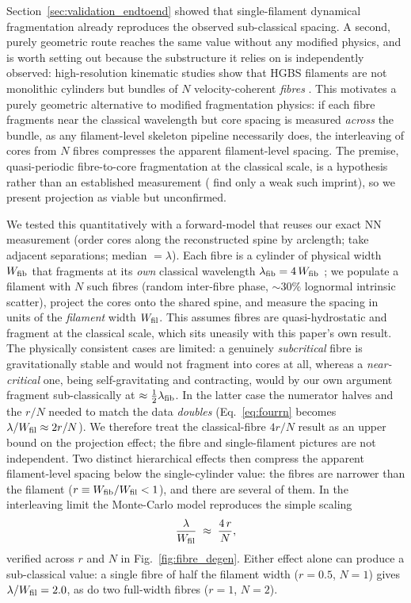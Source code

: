 \documentclass[usenatbib,twoside,twocolumn]{mnras}
\begin{document}
Section~\ref{sec:validation_endtoend} showed that single-filament dynamical fragmentation already reproduces the observed sub-classical spacing. A second, purely geometric route reaches the same value without any modified physics, and is worth setting out because the substructure it relies on is independently observed: high-resolution kinematic studies show that HGBS filaments are not monolithic cylinders but bundles of $N$ velocity-coherent \emph{fibres} \citep{Hacar2013,Hacar2018,Yang2024}. This motivates a purely geometric alternative to modified fragmentation physics: if each fibre fragments near the classical wavelength but core spacing is measured \emph{across} the bundle, as any filament-level skeleton pipeline necessarily does, the interleaving of cores from $N$ fibres compresses the apparent filament-level spacing. The premise, quasi-periodic fibre-to-core fragmentation at the classical scale, is a hypothesis rather than an established measurement (\citealt{Yang2024} find only a weak such imprint), so we present projection as viable but unconfirmed.

We tested this quantitatively with a forward-model that reuses our exact NN measurement (order cores along the reconstructed spine by arclength; take adjacent separations; median $=\lambda$). Each fibre is a cylinder of physical width $W_{\rm fib}$ that fragments at its \emph{own} classical wavelength $\lambda_{\rm fib}=4\,W_{\rm fib}$ \citep{Inutsuka1992}; we populate a filament with $N$ such fibres (random inter-fibre phase, $\sim30\%$ lognormal intrinsic scatter), project the cores onto the shared spine, and measure the spacing in units of the \emph{filament} width $W_{\rm fil}$. This assumes fibres are quasi-hydrostatic and fragment at the classical scale, which sits uneasily with this paper's own result. The physically consistent cases are limited: a genuinely \emph{subcritical} fibre is gravitationally stable and would not fragment into cores at all, whereas a \emph{near-critical} one, being self-gravitating and contracting, would by our own argument fragment sub-classically at $\approx\tfrac12\lambda_{\rm fib}$. In the latter case the numerator halves and the $r/N$ needed to match the data \emph{doubles} (Eq.~\ref{eq:fourrn} becomes $\lambda/W_{\rm fil}\approx2r/N$). We therefore treat the classical-fibre $4r/N$ result as an upper bound on the projection effect; the fibre and single-filament pictures are not independent. Two distinct hierarchical effects then compress the apparent filament-level spacing below the single-cylinder value: the fibres are narrower than the filament ($r\equiv W_{\rm fib}/W_{\rm fil}<1$), and there are several of them. In the interleaving limit the Monte-Carlo model reproduces the simple scaling
\begin{equation}
\frac{\lambda}{W_{\rm fil}} \;\approx\; \frac{4\,r}{N},
\label{eq:fourrn}
\end{equation}
verified across $r$ and $N$ in Fig.~\ref{fig:fibre_degen}. Either effect alone can produce a sub-classical value: a single fibre of half the filament width ($r=0.5$, $N=1$) gives $\lambda/W_{\rm fil}=2.0$, as do two full-width fibres ($r=1$, $N=2$).
\end{document}
